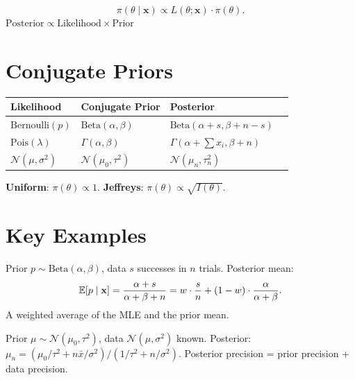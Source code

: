 \begin{theorem}
\[
\pi(\theta\mid\mathbf{x}) \propto L(\theta;\mathbf{x})\cdot\pi(\theta).
\]
$\boxed{\text{Posterior} \propto \text{Likelihood} \times \text{Prior}}$
\end{theorem}

\section{Conjugate Priors}

\begin{center}
\begin{tabular}{llll}
\toprule
\textbf{Likelihood} & \textbf{Conjugate Prior} & \textbf{Posterior} \\
\midrule
$\mathrm{Bernoulli}(p)$ & $\mathrm{Beta}(\alpha,\beta)$ & $\mathrm{Beta}(\alpha+s,\beta+n-s)$ \\
$\mathrm{Pois}(\lambda)$ & $\Gamma(\alpha,\beta)$ & $\Gamma(\alpha+\sum x_i,\beta+n)$ \\
$\mathcal{N}(\mu,\sigma^2)$ & $\mathcal{N}(\mu_0,\tau^2)$ & $\mathcal{N}(\mu_n,\tau_n^2)$ \\
\bottomrule
\end{tabular}
\end{center}

\begin{definition}
\textbf{Uniform}: $\pi(\theta)\propto 1$. \textbf{Jeffreys}: $\pi(\theta)\propto\sqrt{I(\theta)}$.
\end{definition}

\section{Key Examples}

\begin{example}
Prior $p\sim\mathrm{Beta}(\alpha,\beta)$, data $s$ successes in $n$ trials. Posterior mean:
\[
\mathbb{E}[p\mid\mathbf{x}] = \frac{\alpha+s}{\alpha+\beta+n} = w\cdot\frac{s}{n} + (1-w)\cdot\frac{\alpha}{\alpha+\beta}.
\]
A weighted average of the MLE and the prior mean.
\end{example}

\begin{example}
Prior $\mu\sim\mathcal{N}(\mu_0,\tau^2)$, data $\mathcal{N}(\mu,\sigma^2)$ known. Posterior: $\mu_n=({\mu_0/\tau^2+n\bar{x}/\sigma^2})/({1/\tau^2+n/\sigma^2})$.
Posterior precision = prior precision + data precision.
\end{example}

